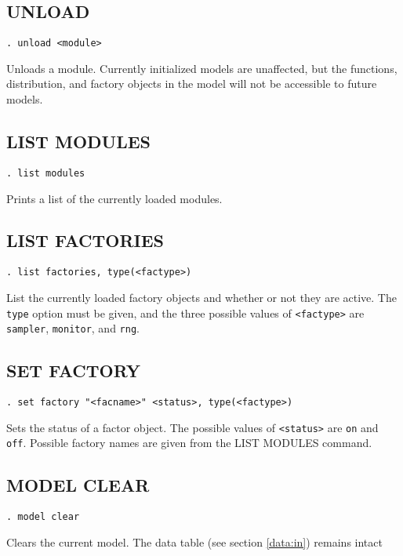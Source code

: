 \documentclass[11pt, a4paper, titlepage]{report}
\begin{document}
\subsection{UNLOAD}
\label{unload}
\begin{verbatim}
. unload <module>
\end{verbatim}
Unloads a module. Currently initialized models are unaffected, but
the functions, distribution, and factory objects in the model will not
be accessible to future models.

\subsection{LIST MODULES}
\label{list:modules}
\begin{verbatim}
. list modules
\end{verbatim}
Prints a list of the currently loaded modules.

\subsection{LIST FACTORIES}
\label{list:factories}
\begin{verbatim}
. list factories, type(<factype>)
\end{verbatim}
List the currently loaded factory objects and whether or not they are
active.  The \verb+type+ option must be given, and the three possible values
of \verb+<factype>+ are \verb+sampler+, \verb+monitor+, and \verb+rng+.

\subsection{SET FACTORY}
\label{set:factory}
\begin{verbatim}
. set factory "<facname>" <status>, type(<factype>)
\end{verbatim}
Sets the status of a factor object. The possible values of \verb+<status>+
are \verb+on+ and \verb+off+. Possible factory names are given from the
LIST MODULES command.

\subsection{MODEL CLEAR}
\label{model:clear}
\begin{verbatim}
. model clear
\end{verbatim}
Clears the current model.  The data table (see section \ref{data:in})
remains intact
\end{document}
